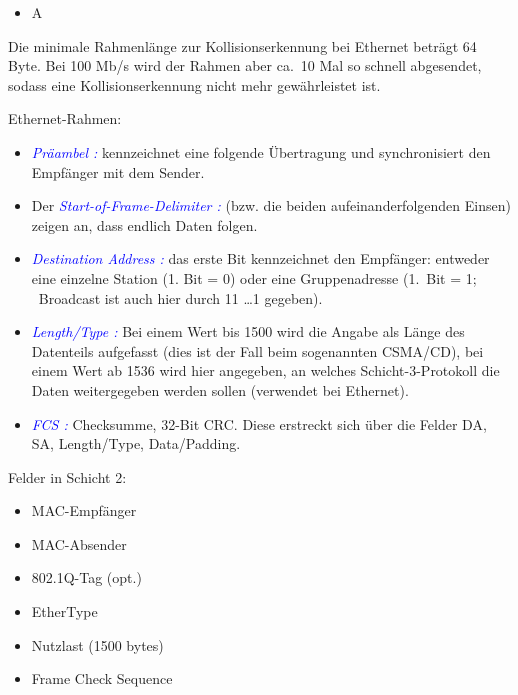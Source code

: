 \begin{itemize}
    \item  \todo A
\end{itemize}

Die minimale Rahmenlänge zur Kollisionserkennung bei Ethernet beträgt 64 Byte.
Bei 100 Mb/s wird der Rahmen aber ca.\ 10 Mal so schnell abgesendet, sodass eine Kollisionserkennung nicht mehr gewährleistet ist.

Ethernet-Rahmen:
\begin{itemize}
    \item \textcolor{blue}{\textit{Präambel :}} kennzeichnet eine folgende Übertragung und synchronisiert den Empfänger mit dem Sender.
    \item Der \textcolor{blue}{\textit{Start-of-Frame-Delimiter :}} (bzw. die beiden aufeinanderfolgenden Einsen) zeigen an, dass endlich Daten folgen.
    \item \textcolor{blue}{\textit{Destination Address :}} das erste Bit kennzeichnet den Empfänger: entweder eine einzelne Station (1. Bit = 0) oder eine Gruppenadresse (1.\ Bit = 1; \ Broadcast ist auch hier durch 11 \ldots 1 gegeben).
    \item \textcolor{blue}{\textit{Length/Type :}} Bei einem Wert bis 1500 wird die Angabe als Länge des Datenteils aufgefasst (dies ist der Fall beim sogenannten CSMA/CD), bei einem Wert ab 1536 wird hier angegeben, an welches Schicht-3-Protokoll die Daten weitergegeben werden sollen (verwendet bei Ethernet).
    \item \textcolor{blue}{\textit{FCS :}} Checksumme, 32-Bit CRC. Diese erstreckt sich über die Felder DA, SA, Length/Type, Data/Padding.
\end{itemize}
Felder in Schicht 2:
\begin{itemize}
    \item MAC-Empfänger
    \item MAC-Absender
    \item 802.1Q-Tag (opt.)
    \item EtherType
    \item Nutzlast (1500 bytes)
    \item Frame Check Sequence
\end{itemize}

